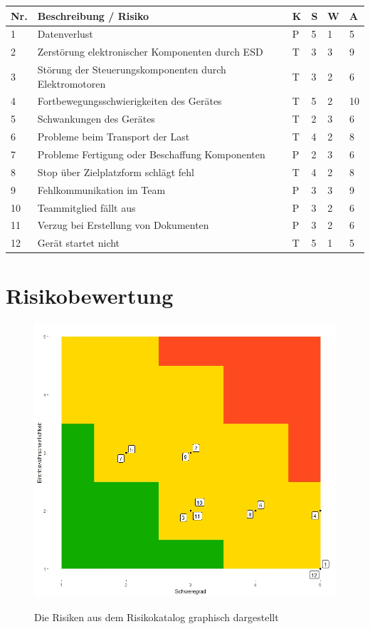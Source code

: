 \documentclass[a4paper]{report}
\begin{document}
\vspace{1em}
\noindent
\begin{tabular}{|p{}|p{}|p{}|p{}|p{}||p{}|}
	\hline
	\textbf{Nr.} & \textbf{Beschreibung / Risiko} & \textbf{K} & \textbf{S} & \textbf{W} & \textbf{A} \\
	\hline
	1 & Datenverlust & P & 5 & 1 & 5\\
	\hline
	2 & Zerstörung elektronischer Komponenten durch ESD & T & 3 & 3 & 9 \\
	\hline
	3 & Störung der Steuerungskomponenten durch Elektromotoren & T & 3 & 2 & 6 \\
	\hline
	4 & Fortbewegungsschwierigkeiten des Gerätes & T & 5 & 2 & 10 \\
	\hline
	5 & Schwankungen des Gerätes & T & 2 & 3 & 6 \\
	\hline
	6 & Probleme beim Transport der Last & T & 4 & 2 & 8 \\
	\hline
	7 & Probleme Fertigung oder Beschaffung Komponenten & P & 2 & 3 & 6 \\
	\hline
	8 & Stop über Zielplatzform schlägt fehl & T & 4 & 2 & 8 \\
	\hline
	9 & Fehlkommunikation im Team & P & 3 & 3 & 9 \\
	\hline
	10 & Teammitglied fällt aus & P & 3 & 2 & 6 \\
	\hline
	11 & Verzug bei Erstellung von Dokumenten & P & 3 & 2 & 6 \\
	\hline
	12 & Gerät startet nicht & T & 5 & 1 & 5 \\
	\hline
\end{tabular}

\section{Risikobewertung}

\begin{figure}[h!]
	\centering
	\includegraphics[width=.6\textwidth,keepaspectratio]{Risikomatrix}
	\label{fig:Risikomatrix}
	\caption{Die Risiken aus dem Risikokatalog graphisch dargestellt}
\end{figure}
\end{document}
